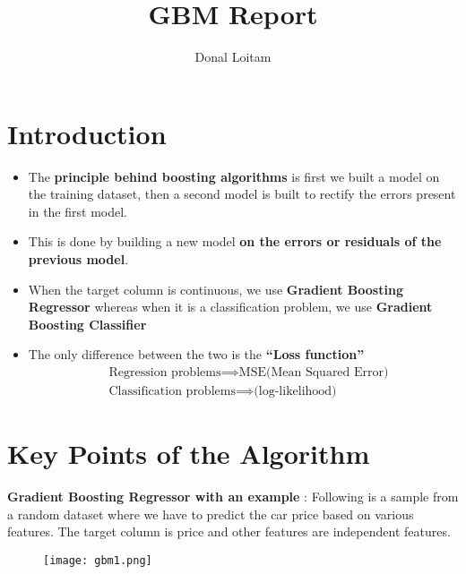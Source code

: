 \documentclass[a4paper, 11pt]{article}
\title{GBM Report}
\author{Donal Loitam}
\begin{document}
\maketitle
\tableofcontents

\section{Introduction}
\begin{itemize}
    \item The \textbf{principle behind boosting algorithms} is first we built a model on the training dataset, then a second model is built to rectify the errors present in the first model.
    \item This is done by building a new model \textbf{on the errors or residuals of the previous model}.
    \item When the target column is continuous, we use \textbf{Gradient Boosting Regressor} whereas when it is a classification problem, we use \textbf{Gradient Boosting Classifier}
    \item The only difference between the two is the \textbf{“Loss function”}
    \begin{align}
        &\text{Regression problems} \implies \text{MSE(Mean Squared Error)} \\
        &\text{Classification problems} \implies \text{(log-likelihood)}
    \end{align}
\end{itemize}


\section{Key Points of the Algorithm}

    \textbf{Gradient Boosting Regressor with an example}  : Following is a sample from a random dataset where we
     have to predict the car price based on various features. The target column is price and other features are independent features.

     \begin{figure}[h!]
        \centering
        \texttt{[image: gbm1.png]}
        \label{fig:fig1}
      \end{figure}
\end{document}
